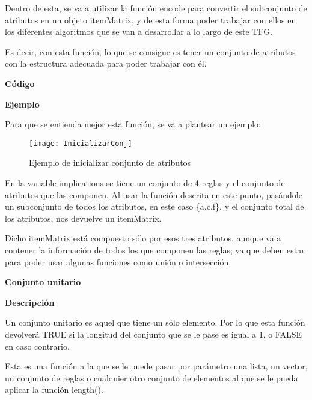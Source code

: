     Dentro de esta, se va a utilizar la funci\'on encode para convertir el subconjunto de atributos en un objeto itemMatrix, y de esta 
    forma poder trabajar con ellos en los diferentes algoritmos que se van a desarrollar a lo largo de este TFG.

    Es decir, con esta funci\'on, lo que se consigue es tener un conjunto de atributos con la estructura adecuada para poder trabajar con \'el.
    \\

    \bigskip
    
    \textbf{C\'odigo}
    
    
    \clearpage
    
    \textbf{Ejemplo}

    Para que se entienda mejor esta funci\'on, se va a plantear un ejemplo:

    \begin{figure}[H]
        \centering
        \texttt{[image: InicializarConj]}
        \caption{Ejemplo de inicializar conjunto de atributos}
        \label{fig:InicializarConj}
    \end{figure}

    En la variable implications se tiene un conjunto de 4 reglas y el conjunto de atributos que las componen.
    Al usar la funci\'on descrita en este punto, pas\'andole un subconjunto de todos los atributos, en este caso \{a,c,f\}, y 
    el conjunto total de los atributos, nos devuelve un itemMatrix. 
    
    Dicho itemMatrix est\'a compuesto s\'olo por esos tres atributos, aunque va a contener la informaci\'on de todos los que 
    componen las reglas; ya que deben estar para poder usar algunas funciones como uni\'on o intersecci\'on.
    \\

\clearpage

\textbf{ \large Conjunto unitario}

\smallskip

    \textbf{Descripci\'on}
    
    Un conjunto unitario es aquel que tiene un s\'olo elemento. Por lo que esta funci\'on 
    devolver\'a TRUE si la longitud del conjunto que se le pase es igual a 1, o FALSE en caso 
    contrario.

    Esta es una funci\'on a la que se le puede pasar por par\'ametro una lista, un vector, 
    un conjunto de reglas o cualquier otro conjunto de elementos al que se le pueda aplicar la funci\'on 
    length().
    \\


